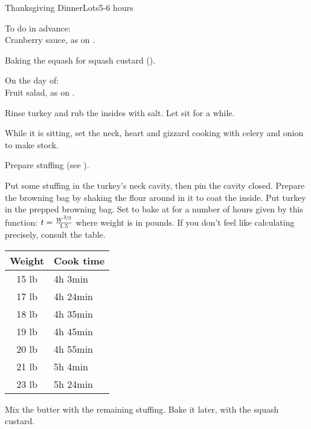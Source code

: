 \documentclass[../Cookbook.tex]{subfiles}
\begin{document}
\begin{recipe}{Thanksgiving Dinner}{Lots}{5-6 hours}

To do in advance: \\
Cranberry sauce, as on .

Baking the squash for squash custard ().

\newstep
On the day of: \\
Fruit salad, as on .

Rinse turkey and rub the insides with salt. Let sit for a while.

While it is sitting, set the neck, heart and gizzard cooking with celery and onion to make stock.

Prepare stuffing (see ).

\begin{minipage}{.7\textwidth}
	Put some stuffing in the turkey's neck cavity, then pin the cavity closed.
	Prepare the browning bag by shaking the flour around in it to coat the inside.
	Put turkey in the prepped browning bag.
	Set to bake at  for a number of hours given by this function:
	$ t = \frac{W^{\nicefrac{2}{3}}}{1.5} $
	where weight is in pounds.
	If you don't feel like calculating precisely, consult the table.
\end{minipage}
\begin{minipage}{.29\textwidth}
	\begin{tabular}{cl}
		Weight & Cook time \\ \hline
		15 lb & 4h 3min \\
		17 lb & 4h 24min \\
		18 lb & 4h 35min \\
		19 lb & 4h 45min \\
		20 lb & 4h 55min \\
		21 lb & 5h 4min \\
		23 lb & 5h 24min
	\end{tabular}
\end{minipage}

Mix the butter with the remaining stuffing. Bake it later, with the squash custard.


\end{recipe}
\end{document}
